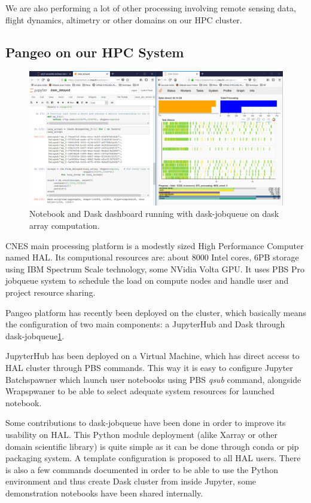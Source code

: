 \documentclass{article}
\begin{document}
We are also performing a lot of other processing involving remote sensing data, flight dynamics, altimetry or other domains on our HPC cluster.

\subsection{Pangeo on our HPC System}
\label{ssec:pangeohpc}

\begin{figure}
  \centering
  \includegraphics[width=\columnwidth]{dask_jobqueue.png}
  \caption{\label{dask_jobqueue} Notebook and Dask dashboard running with dask-jobqueue on dask array computation.}
\end{figure}

CNES main processing platform is a modestly sized High Performance Computer named HAL. Its computional resources are: about 8000 Intel cores, 6PB storage using IBM Spectrum Scale technology, some NVidia Volta GPU. It uses PBS Pro jobqueue system to schedule the load on compute nodes and handle user and project resource sharing.

Pangeo platform has recently been deployed on the cluster, which basically means the configuration of two main components: a JupyterHub and Dask through dask-jobqueue\ref{dask_jobqueue}.

JupyterHub has been deployed on a Virtual Machine, which has direct access to HAL cluster through PBS commands. This way it is easy to configure Jupyter Batchspawner which launch user notebooks using PBS \textit{qsub} command, alongside Wrapspwaner to be able to select adequate system resources for launched notebook. 

Some contributions to dask-jobqueue have been done in order to improve its usability on HAL. This Python module deployment (alike Xarray or other domain scientific library) is quite simple as it can be done through conda or pip packaging system. A template configuration is proposed to all HAL users. There is also a few commands documented in order to be able to use the Python environment and thus create Dask cluster from inside Jupyter, some demonstration notebooks have been shared internally.
\end{document}
